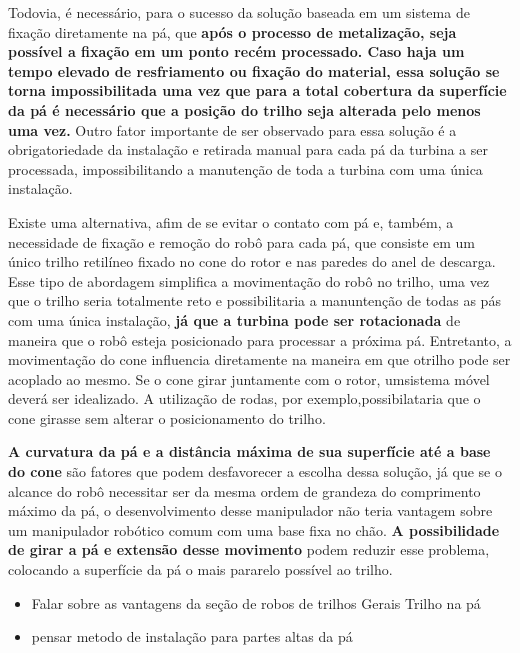 Todovia, é necessário, para o sucesso da solução baseada em um sistema de
fixação diretamente na pá, que \textbf{após o processo de metalização, seja 
possível a fixação em um ponto recém processado. Caso haja um tempo elevado de resfriamento ou fixação do material,
essa solução se torna impossibilitada uma vez que para a total cobertura da 
superfície da pá é necessário que a posição do trilho seja alterada pelo menos 
uma vez.} Outro fator importante de ser observado para essa solução é a
obrigatoriedade da instalação e retirada manual para cada pá da turbina a ser
processada, impossibilitando a manutenção de toda a turbina com uma única
instalação.

Existe uma alternativa, afim de se evitar o contato com pá e, também, a
necessidade de fixação e remoção do robô para cada pá, que consiste em um único trilho
retilíneo fixado no cone do rotor e nas paredes do anel de descarga. Esse tipo
de abordagem simplifica a movimentação do robô no trilho, uma vez que o trilho
seria totalmente reto e possibilitaria a manuntenção de todas as pás com uma
única instalação, \textbf{já que a turbina pode ser rotacionada} de maneira que o robô
esteja posicionado para processar a próxima pá. Entretanto, a movimentação do 
cone influencia diretamente na maneira em que otrilho pode ser acoplado ao 
mesmo. Se o cone girar juntamente com o rotor, umsistema móvel deverá ser 
idealizado. A utilização de rodas, por exemplo,possibilataria que o cone 
girasse sem alterar o posicionamento do trilho. 

\textbf{A curvatura da pá e a distância máxima de sua superfície até a base do
cone} são fatores que podem desfavorecer a escolha dessa solução, já que se o
alcance do robô necessitar ser da mesma ordem de grandeza do comprimento máximo
da pá, o desenvolvimento desse manipulador não teria vantagem sobre um
manipulador robótico comum com uma base fixa no chão. \textbf{A possibilidade
de girar a pá e extensão desse movimento} podem reduzir esse problema, colocando
a superfície da pá o mais pararelo possível ao trilho.



 \begin{itemize}
   \item Falar sobre as vantagens da seção de robos de trilhos
 Gerais	
 Trilho na pá
  \item pensar metodo de instalação para partes altas da pá
\end{itemize}

